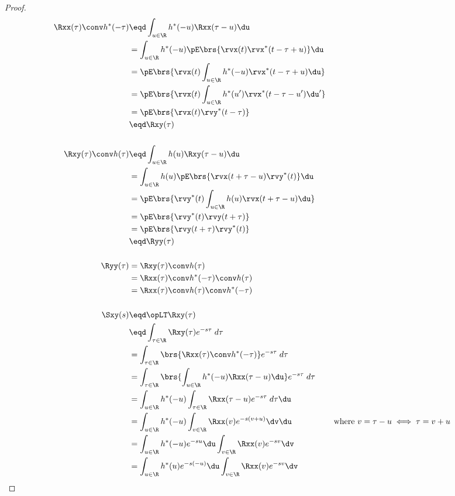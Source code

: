 \begin{proof}
\begin{align*}
   \Rxx(\tau) \conv h^\ast(-\tau)
     &\eqd \int_{u\in\R}h^\ast(-u) \Rxx(\tau-u)\du
   \\&=    \int_{u\in\R}h^\ast(-u) \pE\brs{\rvx(t) \rvx^\ast(t-\tau+u) } \du
   \\&=    \pE\brs{\rvx(t) \int_{u\in\R}h^\ast(-u)  \rvx^\ast(t-\tau+u) \du   }
   \\&=    \pE\brs{\rvx(t) \int_{u\in\R}h^\ast(u^\prime)  \rvx^\ast(t-\tau-u^\prime) \du^\prime   }
   \\&=    \pE\brs{\rvx(t) \rvy^\ast(t-\tau)  }
   \\&\eqd \Rxy(\tau)
\\
\\
   \Rxy(\tau) \conv h(\tau)
     &\eqd \int_{u\in\R}h(u) \Rxy(\tau-u)\du
   \\&=    \int_{u\in\R}h(u) \pE\brs{\rvx(t+\tau-u) \rvy^\ast(t) } \du
   \\&=    \pE\brs{\rvy^\ast(t) \int_{u\in\R}h(u) \rvx(t+\tau-u)  \du }
   \\&=    \pE\brs{\rvy^\ast(t) \rvy(t+\tau) }
   \\&=    \pE\brs{ \rvy(t+\tau) \rvy^\ast(t)}
   \\&\eqd \Ryy(\tau)
\\
\\
   \Ryy(\tau)
     &= \Rxy(\tau) \conv h(\tau)
   \\&= \Rxx(\tau) \conv h^\ast(-\tau) \conv h(\tau)
   \\&= \Rxx(\tau) \conv h(\tau)  \conv h^\ast(-\tau)
\\
\\
  \Sxy(s)
     &\eqd \opLT \Rxy(\tau)
   \\&\eqd \int_{\tau\in\R}\Rxy(\tau) e^{-s\tau} \; d\tau
   \\&=    \int_{\tau\in\R}\brs{ \Rxx(\tau) \conv h^\ast(-\tau) } e^{-s\tau} \; d\tau
   \\&=    \int_{\tau\in\R}\brs{ \int_{u\in\R}h^\ast(-u) \Rxx(\tau-u)\du } e^{-s\tau} \; d\tau
   \\&=    \int_{u\in\R}h^\ast(-u) \int_{\tau\in\R}\Rxx(\tau-u)e^{-s\tau} \; d\tau\du
   \\&=    \int_{u\in\R}h^\ast(-u) \int_{v\in\R}\Rxx(v)e^{-s(v+u)} \dv \du
     && \text{where $v=\tau-u\iff \tau=v+u$}
   \\&=    \int_{u\in\R}h^\ast(-u) e^{-su} \du \int_{v\in\R}\Rxx(v)e^{-sv} \dv
   \\&=    \int_{u\in\R}h^\ast(u) e^{-s(-u)} \du \int_{v\in\R}\Rxx(v)e^{-sv} \dv

\end{align*}
\end{proof}
